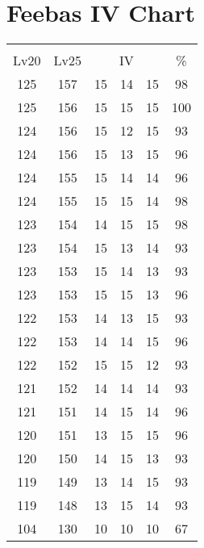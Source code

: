 \documentclass{article}%
\begin{document}
%
\normalsize%
\section{Feebas IV Chart}%
\label{sec:Feebas IV Chart}%
\renewcommand{\arraystretch}{1.5}%
\begin{tabular}{|c|c|c|c|c|c|}%
\hline%
\multicolumn{6}{|c|}{\textcolor{white}{ 
\linebreak{Feebas}
}%
\cellcolor{black}}\\%
\multicolumn{1}{|c}{Lv20}&\multicolumn{1}{c|}{Lv25}&\multicolumn{3}{c|}{IV}&\multicolumn{1}{|c|}{\%}\\%
\hline%
\rowcolor{color98}%
125&157&15&14&15&98\\%
\hline%
\rowcolor{color100}%
125&156&15&15&15&100\\%
\hline%
\rowcolor{color93}%
124&156&15&12&15&93\\%
\hline%
\rowcolor{color96}%
124&156&15&13&15&96\\%
\hline%
\rowcolor{color96}%
124&155&15&14&14&96\\%
\hline%
\rowcolor{color98}%
124&155&15&15&14&98\\%
\hline%
\rowcolor{color98}%
123&154&14&15&15&98\\%
\hline%
\rowcolor{color93}%
123&154&15&13&14&93\\%
\hline%
\rowcolor{color93}%
123&153&15&14&13&93\\%
\hline%
\rowcolor{color96}%
123&153&15&15&13&96\\%
\hline%
\rowcolor{color93}%
122&153&14&13&15&93\\%
\hline%
\rowcolor{color96}%
122&153&14&14&15&96\\%
\hline%
\rowcolor{color93}%
122&152&15&15&12&93\\%
\hline%
\rowcolor{color93}%
121&152&14&14&14&93\\%
\hline%
\rowcolor{color96}%
121&151&14&15&14&96\\%
\hline%
\rowcolor{color96}%
120&151&13&15&15&96\\%
\hline%
\rowcolor{color93}%
120&150&14&15&13&93\\%
\hline%
\rowcolor{color93}%
119&149&13&14&15&93\\%
\hline%
\rowcolor{color93}%
119&148&13&15&14&93\\%
\hline%
\rowcolor{color91}%
104&130&10&10&10&67\\%
\end{tabular}

%
\end{document}

